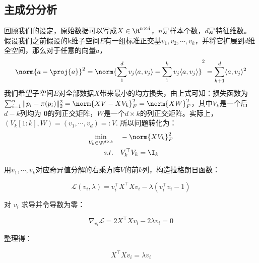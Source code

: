 \documentclass[lang=cn,newtx,10pt,scheme=chinese,chinesefont=nofont,citestyle=gb7714-2015, bibstyle=gb7714-2015]{elegantbook}
\begin{document}
\begin{refsection}
\subsection{主成分分析}
回顾我们的设定，原始数据可以写成$X\in \R^{n\times d}$，$n$是样本个数，$d$是特征维数。
假设我们之前假设的k维子空间$E$有一组标准正交基$v_1,v_2,\cdots,v_k$，并将它扩展到$d$维全空间，那么对于任意的向量$a$，
\begin{equation*}
    \norm{a-\proj{a}}^2=\norm{\sum_1^d v_j\langle a,v_j\rangle-\sum_1^k  v_j\langle a,v_j\rangle}^2
    =\sum_{k+1}^d  \langle a,v_j\rangle^2
\end{equation*}
我们希望子空间$E$对全部数据$X$带来最小的均方损失，由上式可知：损失函数为$\sum_{i=1}^{n} \|p_{i}-\pi(p_{i})\|_{2}^{2}=\norm{XV-XV_k}_F^2=\norm{XW}_F^2$，其中$V_k$是一个后$d-k$列均为
$\mathbf{0}$的列正交矩阵，$W$是一个$d\times k$的列正交矩阵。实际上，$(V_k[1:k],W)=(v_1,\cdots, v_d)=:V.$%
所以问题转化为：
\begin{align*}
    \min_{V_k\in\R^{d\times k}}\quad&-\norm{XV_k}_F^2\\
    s.t. \quad&V_k^\top V_k=\I_k
\end{align*}







用$v_1, \cdots, v_k$对应奇异值分解的右乘方阵$V$的前$k$列，构造拉格朗日函数：



\[
\mathcal{L}(v_i, \lambda) = v_i^\top X^\top X v_i - \lambda (v_i^\top v_i - 1)
\]



对 $v_i$ 求导并令导数为零：



\[
\nabla_{v_i} \mathcal{L} = 2 X^\top X v_i - 2 \lambda v_i = 0
\]



整理得：



\[
X^\top X v_i = \lambda v_i
\]




\end{refsection}
\end{document}
